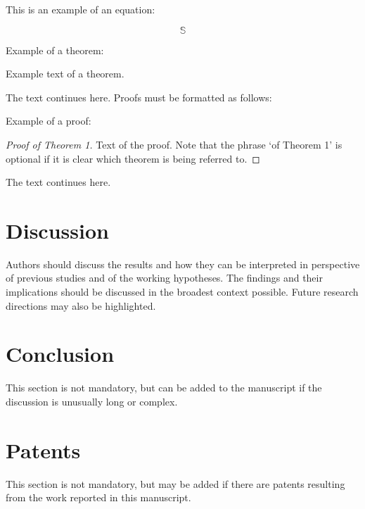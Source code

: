 \documentclass[water,article,submit,moreauthors,pdftex]{mdpi}
\begin{document}
This is an example of an equation:

\begin{equation}
\mathbb{S}
\end{equation}

Example of a theorem:

\begin{Theorem}
Example text of a theorem.
\end{Theorem}

The text continues here. Proofs must be formatted as follows:

Example of a proof:

\begin{proof}[Proof of Theorem 1]
Text of the proof. Note that the phrase `of Theorem 1' is optional if it is clear which theorem is being referred to.
\end{proof}

The text continues here.

\hypertarget{discussion}{%
\section{Discussion}\label{discussion}}

Authors should discuss the results and how they can be interpreted in
perspective of previous studies and of the working hypotheses. The
findings and their implications should be discussed in the broadest
context possible. Future research directions may also be highlighted.

\hypertarget{conclusion}{%
\section{Conclusion}\label{conclusion}}

This section is not mandatory, but can be added to the manuscript if the
discussion is unusually long or complex.

\hypertarget{patents}{%
\section{Patents}\label{patents}}

This section is not mandatory, but may be added if there are patents
resulting from the work reported in this manuscript.

%
\end{document}
